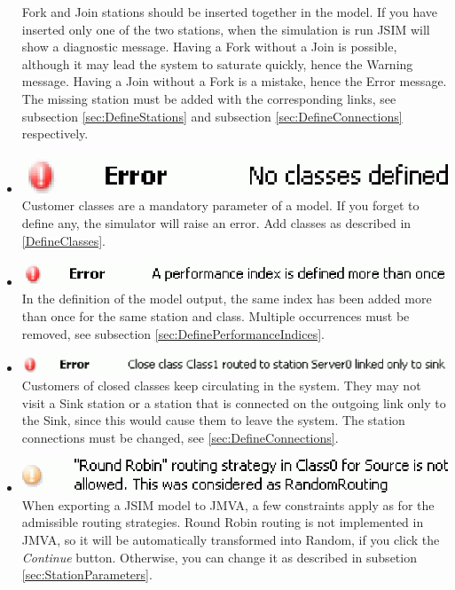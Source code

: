 \begin{itemize}
Fork and Join stations should be inserted together in the model.
If you have inserted only one of the two stations, when the
simulation is run JSIM will show a diagnostic message. Having a
Fork without a Join is possible, although it may lead the system
to saturate quickly, hence the Warning message. Having a Join
without a Fork is a mistake, hence the Error message. The missing
station must be added with the corresponding links, see subsection
\autoref{sec:DefineStations} and subsection
\autoref{sec:DefineConnections} respectively.
\item \includegraphics[scale=.5]{img/jsim/6.eps}\\
Customer classes are a mandatory parameter of a model. If you forget to define any, the simulator will raise an error. Add classes as described in \autoref{DefineClasses}.
\item \includegraphics[scale=.5]{img/jsim/10.eps}\\
In the definition of the model output, the same index has been added more than once for the same station and class. Multiple occurrences must be removed, see subsection
\autoref{sec:DefinePerformanceIndices}.
\item \includegraphics[scale=.5]{img/jsim/11.eps}\\
Customers of closed classes keep circulating in the system. They may not visit a Sink station or a station that is connected on the outgoing link only to the Sink, since this would cause them to leave the system. The station connections must be changed, see \autoref{sec:DefineConnections}.
\item \includegraphics[scale=.5]{img/jsim/12.eps}\\
When exporting a JSIM model to JMVA, a few constraints apply as for the admissible routing strategies. Round Robin routing is not implemented in JMVA, so it will be automatically transformed into Random, if you click the \emph{Continue} button. Otherwise, you can change it as described in subsetion \autoref{sec:StationParameters}.

\end{itemize}
